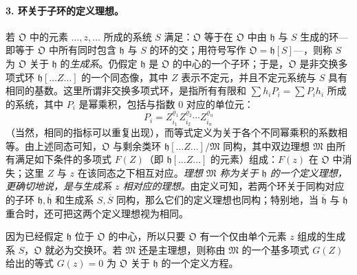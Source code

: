 \documentclass[11pt]{article}
\begin{document}
\paragraph{3. 环关于子环的定义理想。}
若 \(\mathfrak O\) 中的元素 \(\ldots,z,\ldots\) 所成的系统 \(S\) 满足：\(\mathfrak O\) 等于在 \(\mathfrak O\) 中由 \(\mathfrak h\) 与 \(S\) 生成的环---即等于 \(\mathfrak O\) 中所有同时包含 \(\mathfrak h\) 与 \(S\) 的环的交；用符号写作 \(\mathfrak O=\mathfrak h[S]\)---，则称 \(S\) 为 \(\mathfrak O\) 关于 \(\mathfrak h\) 的\emph{生成系}。仍假定 \(\mathfrak h\) 是 \(\mathfrak O\) 的中心的一个子环；于是，\(\mathfrak O\) 是非交换多项式环 \(\mathfrak h[\ldots Z\ldots]\) 的一个同态像，其中 \(Z\) 表示不定元，并且不定元系统与 \(S\) 具有相同的基数。这里所谓非交换多项式环，是指所有有限和 \(\sum h_iP_i=\sum P_i h_i\) 所成的系统，其中 \(P_i\) 是幂乘积，包括与指数 \(0\) 对应的单位元：
\[
P_i=Z_{i_1}^{\varrho_1}Z_{i_2}^{\varrho_2}\cdots Z_{i_n}^{\varrho_n}
\]
（当然，相同的指标可以重复出现），而等式定义为关于各个不同幂乘积的系数相等。由上述同态可知，\(\mathfrak O\) 与剩余类环 \(\mathfrak h[\ldots Z\ldots]/\mathfrak M\) 同构，其中双边理想 \(\mathfrak M\) 由所有满足如下条件的多项式 \(F(Z)\)（即 \(\mathfrak h[\ldots Z\ldots]\) 的元素）组成：\(F(z)\) 在 \(\mathfrak O\) 中消失；这里 \(Z\) 与 \(z\) 在该同态之下相互对应。\emph{理想 \(\mathfrak M\) 称为关于 \(\mathfrak h\) 的一个定义理想，更确切地说，是与生成系 \(z\) 相对应的理想。}由定义可知，若两个环关于同构对应的子环 \(\mathfrak h,\overline{\mathfrak h}\) 和生成系 \(S,\overline S\) 同构，那么它们的定义理想也同构；特别地，当 \(\overline{\mathfrak h}\) 与 \(\mathfrak h\) 重合时，还可把这两个定义理想视为相同。

因为已经假定 \(\mathfrak h\) 位于 \(\mathfrak O\) 的中心，所以只要 \(\mathfrak O\) 有一个仅由单个元素 \(z\) 组成的生成系 \(S\)，\(\mathfrak O\) 就必为交换环。若 \(\mathfrak M\) 还是主理想，则称由 \(\mathfrak M\) 的一个基多项式 \(G(Z)\) 给出的等式 \(G(z)=0\) 为 \(\mathfrak O\) 关于 \(\mathfrak h\) 的一个定义方程。
\end{document}
